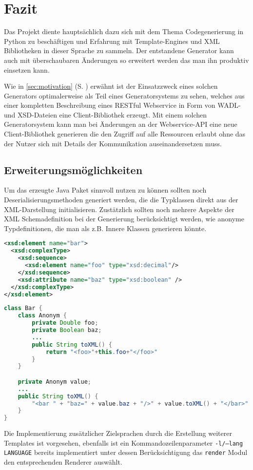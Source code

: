\section{Fazit}
\label{sec:conclusion}

Das Projekt diente hauptsächlich dazu sich mit dem Thema Codegenerierung in Python zu beschäftigen und Erfahrung mit Template-Engines und XML Bibliotheken in dieser Sprache zu sammeln. Der entstandene Generator kann auch mit überschaubaren Änderungen so erweitert werden das man ihn produktiv einsetzen kann.

Wie in \cref{sec:motivation} (S. \pageref{sec:motivation}) erwähnt ist der Einsatzzweck eines solchen Generators optimalerweise als Teil eines Generatorsystems zu sehen, welches aus einer kompletten Beschreibung eines \gls{RESTful} Webservice in Form von \gls{WADL}- und \gls{XSD}-Dateien eine Client-Bibliothek erzeugt. Mit einem solchen Generatorsystem kann man bei Änderungen an der Webservice-API eine neue Client-Bibliothek generieren die den Zugriff auf alle Ressourcen erlaubt ohne das der Nutzer sich mit Details der Kommunikation auseinandersetzen muss. %

\subsection{Erweiterungsmöglichkeiten}
\label{sec:erweiterung}

Um das erzeugte Java Paket sinnvoll nutzen zu können sollten noch Deserialisierungsmethoden generiert werden, die die Typklassen direkt aus der XML-Darstellung initialisieren. Zustätzlich sollten noch mehrere Aspekte der XML Schemadefinition bei der Generierung berücksichtigt werden, wie anonyme Typdefinitionen, die man als z.B. Innere Klassen generieren könnte.

\begin{lstlisting}[language=XML]
<xsd:element name="bar">
  <xsd:complexType>
    <xsd:sequence>
      <xsd:element name="foo" type="xsd:decimal"/>
    </xsd:sequence>
    <xsd:attribute name="baz" type="xsd:boolean" />
  </xsd:complexType>
</xsd:element>
\end{lstlisting}

\begin{lstlisting}[language=Java]
class Bar {
    class Anonym {
        private Double foo;
        private Boolean baz;
        ...
        public String toXML() {
            return "<foo>"+this.foo+"</foo>"
        }
    }

    private Anonym value;
    ...
    public String toXML() {
        "<bar " + "baz=" + value.baz + "/>" + value.toXML() + "</bar>"
    }
}
\end{lstlisting}

Die Implementierung zusätzlicher Zielsprachen durch die Erstellung weiterer Templates ist vorgesehen, ebenfalls ist ein Kommandozeilenparameter \texttt{-l/--lang LANGUAGE} bereits implementiert unter dessen Berücksichtigung das \texttt{render} Modul den entsprechenden Renderer auswählt.
